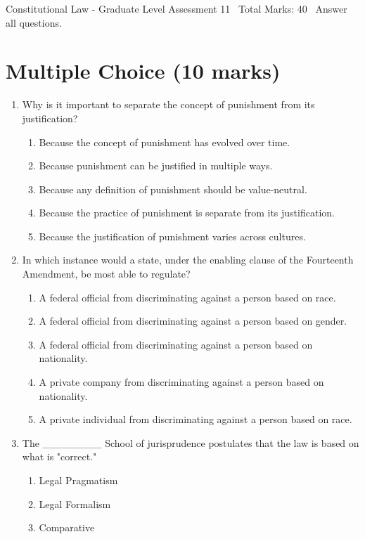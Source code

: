 \documentclass[12pt]{article}
\begin{document}
\begin{center}
Constitutional Law - Graduate Level Assessment 11 \
Total Marks: 40 \
Answer all questions.
\end{center}

\section*{Multiple Choice (10 marks)}
\begin{enumerate}[label=\arabic*.]
\item Why is it important to separate the concept of punishment from its justification?
\begin{enumerate}[label=(\alph*)]
    \item Because the concept of punishment has evolved over time.
    \item Because punishment can be justified in multiple ways.
    \item Because any definition of punishment should be value-neutral.
    \item Because the practice of punishment is separate from its justification.
    \item Because the justification of punishment varies across cultures.
\end{enumerate}
\item In which instance would a state, under the enabling clause of the Fourteenth Amendment, be most able to regulate?
\begin{enumerate}[label=(\alph*)]
    \item A federal official from discriminating against a person based on race.
    \item A federal official from discriminating against a person based on gender.
    \item A federal official from discriminating against a person based on nationality.
    \item A private company from discriminating against a person based on nationality.
    \item A private individual from discriminating against a person based on race.
\end{enumerate}
\item The \_\_\_\_\_\_\_\_ School of jurisprudence postulates that the law is based on what is "correct."
\begin{enumerate}[label=(\alph*)]
    \item Legal Pragmatism
    \item Legal Formalism
    \item Comparative

\end{enumerate}
\end{enumerate}
\end{document}
